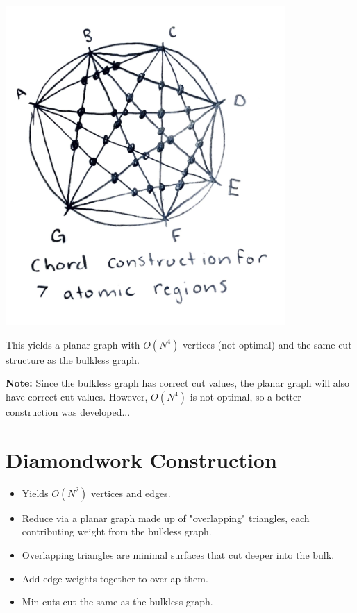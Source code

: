 \documentclass{article}
\begin{document}
\begin{center}
    \includegraphics[width=0.8\textwidth]{chord_construct.pdf}
\end{center}

This yields a planar graph with \( O(N^4) \) vertices (not optimal) and the same cut structure as the bulkless graph.

\textbf{Note:} Since the bulkless graph has correct cut values, the planar graph will also have correct cut values. However, \( O(N^4) \) is not optimal, so a better construction was developed...

\section{Diamondwork Construction}
\begin{itemize}
    \item Yields \( O(N^2) \) vertices and edges.
    \item Reduce via a planar graph made up of "overlapping" triangles, each contributing weight from the bulkless graph.
    \item Overlapping triangles are minimal surfaces that cut deeper into the bulk.
    \item Add edge weights together to overlap them.
    \item Min-cuts cut the same as the bulkless graph.
\end{itemize}
\end{document}
